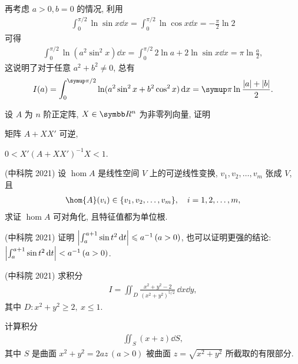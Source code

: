 \begin{exercise}[resume=exer]
\begin{answer}
            再考虑 $ a > 0, b = 0 $ 的情况, 利用
            \begin{align*}
                \int_{0}^{\pi/2} \ln\sin x\dd{x} = \int_{0}^{\pi/2} \ln\cos x\dd{x} = -\frac{\pi}{2} \ln 2
            \end{align*}
            可得
            \begin{align*}
                \int_{0}^{\pi/2} \ln(a^{2}\sin^{2}x) \dd{x} = \int_{0}^{\pi/2} 2\ln a + 2\ln \sin x\dd{x} = \pi\ln\frac{a}{2}, 
            \end{align*}
            这说明了对于任意 $ a^{2} + b^{2} \ne 0 $, 总有
            \begin{align*}
                I(a) = \int_{0}^{\pi/2} \ln (a^{2}\sin^{2}x + b^{2}\cos^{2}x) \dd{x} = \pi\ln\frac{\abs{a} + \abs{b}}{2}.
            \end{align*} 
        \end{answer}
        \item 设 $ A $ 为 $ n $ 阶正定阵, $ X \in \R^{n} $ 为非零列向量, 证明
        \begin{exercise}
            \item 矩阵 $ A + XX' $ 可逆,
            \item $ 0 < X'(A + XX')^{-1}X < 1 $. 
        \end{exercise}
        \item (中科院 2021) 设 $ \hom{A} $ 是线性空间 $ V $ 上的可逆线性变换, $ v_{1}, v_{2}, \dots, v_{m} $ 张成 $ V $, 且
        \begin{align*}
            \hom{A}(v_{i}) \in \set{v_{1}, v_{2}, \dots, v_{m}}, \quad i = 1, 2, \dots, m,
        \end{align*}
        求证 $ \hom{A} $ 可对角化, 且特征值都为单位根. 
        \item (中科院 2021) 证明 $ \abs{\int_{a}^{a + 1} \sin t^{2} \dd{t}} \leqslant a^{-1}\,(a > 0) $, 也可以证明更强的结论: $ \abs{\int_{a}^{a + 1} \sin t^{2} \dd{t}} < a^{-1}\,(a > 0) $. 
        \item (中科院 2021) 求积分 
        \begin{align*}
            I = \iint_{D} \frac{x^{2} + y^{2} - 2}{(x^{2} + y^{2})^{5/2}}\,\dd x\dd y,
        \end{align*}
        其中 $ D: x^{2} + y^{2} \ge 2,\ x \le 1 $.
        \item 计算积分
        \begin{align*}
            \iint_{S} (x + z) \dd{S},
        \end{align*}
        其中 $ S $ 是曲面 $ x^{2} + y^{2} = 2az\,(a > 0) $ 被曲面 $ z = \sqrt{x^{2} + y^{2}} $ 所截取的有限部分.

\end{exercise}
